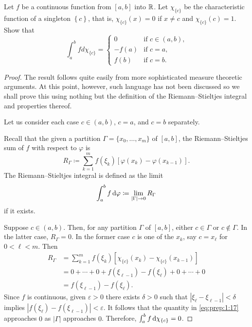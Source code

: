 \begin{problem}
Let $f$ be a continuous function from $[a,b]$ into $\mathbb{R}$. Let
$\chi_{\{c\}}$ be the characteristic function of a singleton
$\left\{c\right\}$, that is, $\chi_{\{c\}}(x)=0$ if $x\neq c$ and
$\chi_{\{c\}}(c)=1$. Show that
\[
\int_a^b f d \chi_{\{c\}}=
\begin{cases}
0&\text{if $c\in(a,b)$,}\\
-f(a)&\text{if $c=a$,}\\
f(b)&\text{if $c=b$.}
\end{cases}
\]
\end{problem}
\begin{proof}
The result follows quite easily from more sophisticated measure theoretic
arguments. At this point, however, such language has not been discussed so
we shall prove this using nothing but the definition of the
Riemann--Stieltjes integral and properties thereof.

Let us consider each case $c\in(a,b)$, $c=a$, and $c=b$ separately.

Recall that the given a partition $\Gamma=\{x_0,\dotsc,x_m\}$ of $[a,b]$,
the Riemann--Stieltjes sum of $f$ with respect to $\varphi$ is
\begin{equation}
  \label{eq:prep:1:15}
R_\Gamma\coloneq\sum_{k=1}^mf(\xi_k)[\varphi(x_k)-\varphi(x_{k-1})].
\end{equation}
The Riemann--Stieltjes integral is defined as the limit
\begin{equation}
\label{eq:prep:1:16}
\int_a^b f\mathop{}\!\mathrm{d}\varphi\coloneq\lim_{|\Gamma|\to 0} R_\Gamma
\end{equation}
if it exists.

Suppose $c\in(a,b)$. Then, for any partition $\Gamma$ of $[a,b]$, either
$c\in\Gamma$ or $c\notin\Gamma$. In the latter case, $R_\Gamma=0$. In the
former case $c$ is one of the $x_k$, say $c=x_\ell$ for $0<\ell<m$. Then
\begin{equation}
\label{eq:prep:1:17}
\begin{aligned}
R_\Gamma&=\sum_{k=1}^mf(\xi_k)[\chi_{\{c\}}(x_k)-\chi_{\{c\}}(x_{k-1})]\\
&=0+\dotsb+0+f(\xi_{\ell-1})-f(\xi_\ell)+0+\dotsb+0\\
&=f(\xi_{\ell-1})-f(\xi_\ell).
\end{aligned}
\end{equation}
Since $f$ is continuous, given $\varepsilon>0$ there exists $\delta>0$ such
that $|\xi_\ell-\xi_{\ell-1}|<\delta$ implies
$|f(\xi_{\ell})-f(\xi_{\ell-1})|<\varepsilon$. It follows that the quantity
in \eqref{eq:prep:1:17} approaches $0$ as $|\Gamma|$ approaches
$0$. Therefore, $\int_a^b f\mathop{}\!\mathrm{d}\chi_{\{c\}}=0$.


\end{proof}
